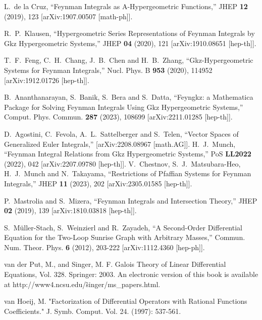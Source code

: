 \documentclass[a4paper,12pt]{article}
\numberwithin{equation}{section}
\numberwithin{figure}{section}
\begin{document}
\begin{thebibliography}{99}
L.~de la Cruz,
``Feynman Integrals as A-Hypergeometric Functions,''
JHEP \textbf{12} (2019), 123
[arXiv:1907.00507 [math-ph]].

R.~P.~Klausen,
``Hypergeometric Series Representations of Feynman Integrals by Gkz Hypergeometric Systems,''
JHEP \textbf{04} (2020), 121
[arXiv:1910.08651 [hep-th]].
  
T.~F.~Feng, C.~H.~Chang, J.~B.~Chen and H.~B.~Zhang,
``Gkz-Hypergeometric Systems for Feynman Integrals,''
Nucl. Phys. B \textbf{953} (2020), 114952
[arXiv:1912.01726 [hep-th]].

B.~Ananthanarayan, S.~Banik, S.~Bera and S.~Datta,
``Feyngkz: a Mathematica Package for Solving Feynman Integrals Using Gkz Hypergeometric Systems,''
Comput. Phys. Commun. \textbf{287} (2023), 108699
[arXiv:2211.01285 [hep-th]].

D.~Agostini, C.~Fevola, A.~L.~Sattelberger and S.~Telen,
``Vector Spaces of Generalized Euler Integrals,''
[arXiv:2208.08967 [math.AG]].
H.~J.~Munch,
``Feynman Integral Relations from Gkz Hypergeometric Systems,''
PoS \textbf{LL2022} (2022), 042
[arXiv:2207.09780 [hep-th]].
V.~Chestnov, S.~J.~Matsubara-Heo, H.~J.~Munch and N.~Takayama,
``Restrictions of Pfaffian Systems for Feynman Integrals,''
JHEP \textbf{11} (2023), 202
[arXiv:2305.01585 [hep-th]].

P.~Mastrolia and S.~Mizera,
``Feynman Integrals and Intersection Theory,''
JHEP \textbf{02} (2019), 139
[arXiv:1810.03818 [hep-th]].

S.~M\"uller-Stach, S.~Weinzierl and R.~Zayadeh,
``A Second-Order Differential Equation for the Two-Loop Sunrise Graph with Arbitrary Masses,''
Commun. Num. Theor. Phys. \textbf{6} (2012), 203-222
[arXiv:1112.4360 [hep-ph]].

  
 van der Put, M., and Singer, M. F. Galois Theory of Linear Differential Equations, Vol. 328. Springer: 2003. An electronic version of this book is available at http://www4.ncsu.edu/\~singer/ms\_papers.html.

  van Hoeij, M. "Factorization of Differential Operators with Rational Functions Coefficients." J. Symb. Comput. Vol. 24. (1997): 537-561.


\end{thebibliography}
\end{document}
